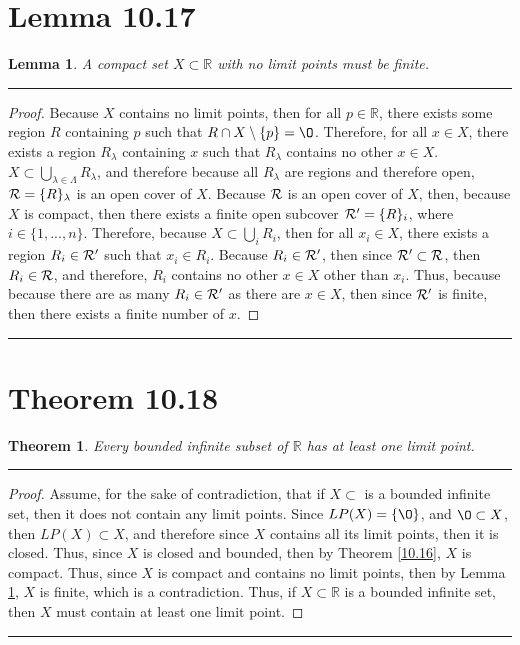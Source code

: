 \documentclass[openany, amssymb, psamsfonts]{amsart}
\newcommand{\bbR}{\mathbb{R}}
\renewcommand{\emptyset}{\O}
\newcommand{\sm}{\setminus}
\newtheorem{thm}{Theorem}[section]
\newtheorem{lem}{Lemma}[section]
\theoremstyle{definition}
\numberwithin{equation}{section}
\begin{document}
\section*{Lemma 10.17}
\begin{lem}
\label{10.17}
A compact set $X \subset \bbR$ with no limit points must be finite.
\end{lem}
\vspace{4pt}     \hrule   \vspace{4pt} \begin{proof}
Because $X$ contains no limit points, then for all $p\in \bbR$, there exists some region $R$ containing $p$ such that $R\cap X\sm\{p\}= \emptyset$. Therefore, for all $x \in X$, there exists a region $R_\lambda$ containing $x$ such that $R_\lambda$ contains no other $x\in X$. $X\subset \bigcup_{\lambda \in \Lambda} R_\lambda$, and therefore because all $R_\lambda$ are regions and therefore open, $\mathcal R = \{R\}_\lambda$ is an open cover of $X$. Because $\mathcal R$ is an open cover of $X$, then, because $X$ is compact, then there exists a finite open subcover $\mathcal R' = \{R\}_i$, where $i\in \{1,...,n\}$. Therefore, because $X\subset \bigcup_iR_i$, then for all $x_i\in X$, there exists a region $R_i\in \mathcal R'$ such that $x_i\in R_i$. Because $R_i \in \mathcal R'$, then since $\mathcal R'\subset \mathcal R$, then $R_i\in \mathcal R$, and therefore, $R_i$ contains no other $x\in X$ other than $x_i$. Thus, because because there are as many $R_i\in \mathcal R'$ as there are $x\in X$, then since $\mathcal R'$ is finite, then there exists a finite number of $x$.
\end{proof}\vspace{4pt}     \hrule   \vspace{4pt}

\section*{Theorem  10.18}
\begin{thm} Every bounded infinite subset of $\bbR$ has at least one limit point.
\end{thm}
\vspace{4pt}     \hrule   \vspace{4pt} \begin{proof}
Assume, for the sake of contradiction, that if $X\subset $ is a bounded infinite set, then it does not contain any limit points. Since $LP(X) = \{\emptyset\}$, and $\emptyset \subset X$, then $LP(X) \subset X$, and therefore since $X$ contains all its limit points, then it is closed. Thus, since $X$ is closed and bounded, then by Theorem \ref{10.16}, $X$ is compact. Thus, since $X$ is compact and contains no limit points, then by Lemma \ref{10.17}, $X$ is finite, which is a contradiction. Thus, if $X\subset \bbR$ is a bounded infinite set, then $X$ must contain at least one limit point. 
\end{proof}\vspace{4pt}     \hrule   \vspace{4pt}
\end{document}
